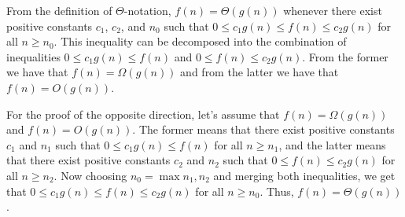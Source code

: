 From the definition of $\Theta$-notation, $f(n)=\Theta(g(n))$ whenever there exist positive constants $c_1$, $c_2$, and $n_0$ such that $0\le c_1g(n)\le f(n)\le c_2g(n)$ for all $n\ge n_0$.
This inequality can be decomposed into the combination of inequalities $0\le c_1g(n)\le f(n)$ and $0\le f(n)\le c_2g(n)$.
From the former we have that $f(n)=\Omega(g(n))$ and from the latter we have that $f(n)=O(g(n))$.

For the proof of the opposite direction, let's assume that $f(n)=\Omega(g(n))$ and $f(n)=O(g(n))$.
The former means that there exist positive constants $c_1$ and $n_1$ such that $0\le c_1g(n)\le f(n)$ for all $n\ge n_1$, and the latter means that there exist positive constants $c_2$ and $n_2$ such that $0\le f(n)\le c_2g(n)$ for all $n\ge n_2$.
Now choosing $n_0=\max{n_1,n_2}$ and merging both inequalities, we get that $0\le c_1g(n)\le f(n)\le c_2g(n)$ for all $n\ge n_0$.
Thus, $f(n)=\Theta(g(n))$.

